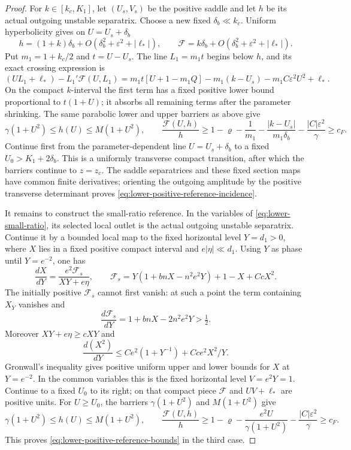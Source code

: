 \begin{proof}
For $k\in[k_c,K_1]$, let $(U_s,V_s)$ be the positive saddle and let $h$
be its actual outgoing unstable separatrix.  Choose a new fixed
$\delta_b\ll k_c$.  Uniform hyperbolicity gives on $U=U_s+\delta_b$
\begin{equation}\label{eq:lower-bounded-reference-entry}
 h=(1+k)\delta_b+O(\delta_b^2+\varepsilon^2+|\ell_*|),\qquad
 \mathcal F=k\delta_b+O(\delta_b^2+\varepsilon^2+|\ell_*|).
\end{equation}
Put $m_1=1+k_c/2$ and $t=U-U_s$.  The line
$L_1=m_1t$ begins below $h$, and its exact crossing expression is
\begin{equation}\label{eq:lower-bounded-reference-linear}
 (UL_1+\ell_*)-L_1'\mathcal F(U,L_1)
 =m_1t[U+1-m_1Q]-m_1(k-U_s)
      -m_1C\varepsilon^2U^2+\ell_*.
\end{equation}
On the compact $k$-interval the first term has a fixed positive lower
bound proportional to $t(1+U)$; it absorbs all remaining terms after
the parameter shrinking.  The same parabolic lower and upper barriers
as above give
\[
 \gamma(1+U^2)\le h(U)\le M(1+U^2),\qquad
 \frac{\mathcal F(U,h)}h
 \ge1-\varrho-\frac1{m_1}
      -\frac{|k-U_s|}{m_1\delta_b}-\frac{|C|\varepsilon^2}{\gamma}
 \ge c_F.
\]
Continue first from the parameter-dependent line $U=U_s+\delta_b$ to a
fixed $U_0>K_1+2\delta_b$.  This is a uniformly transverse compact
transition, after which the barriers continue to $z=z_c$.
The saddle separatrices and these fixed section maps have common finite
derivatives; orienting the outgoing amplitude by the positive transverse
determinant proves \eqref{eq:lower-positive-reference-incidence}.

It remains to construct the small-ratio reference.  In the variables of
\eqref{eq:lower-small-ratio}, its selected local outlet is the actual
outgoing unstable separatrix.  Continue it by a bounded local map to the
fixed horizontal level $Y=d_1>0$, where $X$ lies in a fixed positive
compact interval and $e|\eta|\ll d_1$.  Using $Y$ as phase until
$Y=e^{-2}$, one has
\[
 \frac{dX}{dY}=\frac{e^2\mathcal F_s}{XY+e\eta},\qquad
 \mathcal F_s=Y(1+bnX-n^2e^2Y)+1-X+CcX^2.
\]
The initially positive $\mathcal F_s$ cannot first vanish: at such a
point the term containing $X_Y$ vanishes and
\[
 \frac{d\mathcal F_s}{dY}=1+bnX-2n^2e^2Y>\tfrac12.
\]
Moreover $XY+e\eta\ge cXY$ and
\[
 \frac{d(X^2)}{dY}
 \le Ce^2(1+Y^{-1})+Cce^2X^2/Y.
\]
Gronwall's inequality gives positive uniform upper and lower bounds for
$X$ at $Y=e^{-2}$.  In the common variables this is the fixed horizontal
level $V=e^2Y=1$.  Continue to a fixed $U_0$ to its right; on that compact
piece $\mathcal F$ and $UV+\ell_*$ are positive units.  For $U\ge U_0$,
the barriers $\gamma(1+U^2)$ and $M(1+U^2)$ give
\[
 \gamma(1+U^2)\le h(U)\le M(1+U^2),\qquad
 \frac{\mathcal F(U,h)}h
 \ge1-\varrho-\frac{e^2U}{\gamma(1+U^2)}
             -\frac{|C|\varepsilon^2}{\gamma}\ge c_F.
\]
This proves \eqref{eq:lower-positive-reference-bounds} in the third case.


\end{proof}
